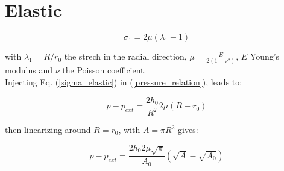 \documentclass{config}
\begin{document}

%
%
%
%
%
%

\section{Elastic}\label{sec_elastic}

\begin{equation}\label{sigma_elastic}
\sigma_1 = 2 \mu (\lambda_1 -1) 
\end{equation}

with $\lambda_1 = R/r_0 $ the strech in the radial direction, $\mu = \displaystyle \frac{E}{2(1- \nu^2)}$,  $E$ Young's modulus and $\nu$ the Poisson coefficient. \\

Injecting Eq. (\ref{sigma_elastic}) in (\ref{pressure_relation}), leads to:

\begin{equation}
p -p_{ext} = \frac{2h_0}{R^2} 2 \mu (R- r_0)
\end{equation}

then linearizing around $R=r_0$, with $A = \pi R^2$ gives:

\begin{equation}
p- p_{ext} = \frac{2 h_0 2 \mu \sqrt{\pi}}{A_0} \left(\sqrt{A} - \sqrt{A_0}\right)
\end{equation}
\end{document}

